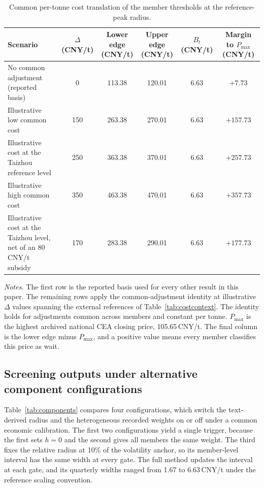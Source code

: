 \documentclass[5p,times,authoryear]{elsarticle}
\theoremstyle{plain}
\begin{document}
\begin{table}[!t]
\caption{Common per-tonne cost translation of the member thresholds at the reference-peak radius.}
\label{tab:translation}
\centering
\footnotesize
\begin{tabular}{@{}lccccc@{}}
\toprule
Scenario & \makecell{$\Delta$\\(CNY/t)} & \makecell{Lower edge\\(CNY/t)} & \makecell{Upper edge\\(CNY/t)} & \makecell{$B_t$\\(CNY/t)} & \makecell{Margin to $P_{\max}$\\(CNY/t)}\\
\midrule
No common adjustment (reported basis) & 0 & 113.38 & 120.01 & 6.63 & $+7.73$\\
Illustrative low common cost & 150 & 263.38 & 270.01 & 6.63 & $+157.73$\\
Illustrative cost at the Taizhou reference level & 250 & 363.38 & 370.01 & 6.63 & $+257.73$\\
Illustrative high common cost & 350 & 463.38 & 470.01 & 6.63 & $+357.73$\\
Illustrative cost at the Taizhou level, net of an 80\,CNY/t subsidy & 170 & 283.38 & 290.01 & 6.63 & $+177.73$\\
\bottomrule
\end{tabular}
\par\smallskip
\parbox{0.95\textwidth}{\footnotesize\emph{Notes.} The first row is the reported basis used for every other result in this paper. The remaining rows apply the common-adjustment identity at illustrative $\Delta$ values spanning the external references of Table~\ref{tab:costcontext}. The identity holds for adjustments common across members and constant per tonne. $P_{\max}$ is the highest archived national CEA closing price, 105.65\,CNY/t. The final column is the lower edge minus $P_{\max}$, and a positive value means every member classifies this price as wait.}
\end{table}

\subsection{Screening outputs under alternative component configurations}

Table~\ref{tab:components} compares four configurations, which switch the text-derived radius and the heterogeneous recorded weights on or off under a common economic calibration. The first two configurations yield a single trigger, because the first sets $h=0$ and the second gives all members the same weight. The third fixes the relative radius at 10\% of the volatility anchor, so its member-level interval has the same width at every gate. The full method updates the interval at each gate, and its quarterly widths ranged from 1.67 to 6.63\,CNY/t under the reference scaling convention.
\end{document}
